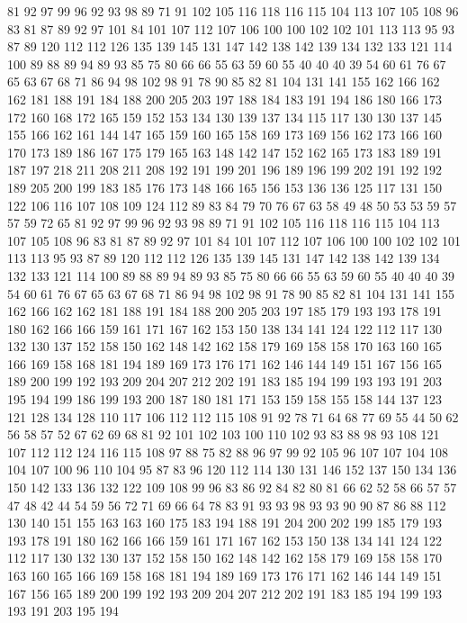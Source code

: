 81 92 97 99 96 92 93 98 89 71 91 102 105 116 118 116 115 104 113 107
105 108 96 83 81 87 89 92 97 101 84 101 107 112 107 106 100 100 102 102
101 113 113 95 93 87 89 120 112 112 126 135 139 145 131 147 142 138 142 139
134 132 133 121 114 100 89 88 89 94 89 93 85 75 80 66 66 55 63 59
60 55 40 40 40 39 54 60 61 76 67 65 63 67 68 71 86 94 98 102
98 91 78 90 85 82 81 104 131 141 155 162 166 162 162 181 188 191 184 188
200 205 203 197 188 184 183 191 194 186 180 166 173 172 160 168 172 165 159 152
153 134 130 139 137 134 115 117 130 130 137 145 155 166 162 161 144 147 165 159
160 165 158 169 173 169 156 162 173 166 160 170 173 189 186 167 175 179 165 163
148 142 147 152 162 165 173 183 189 191 187 197 218 211 208 211 208 192 191 199
201 196 189 196 199 202 191 192 192 189 205 200 199 183 185 176 173 148 166 165
156 153 136 136 125 117 131 150 122 106 116 107 108 109 124 112 89 83 84 79
70 76 67 63 58 49 48 50 53 53 59 57 57 59 72 65 81 92 97 99
96 92 93 98 89 71 91 102 105 116 118 116 115 104 113 107 105 108 96 83
81 87 89 92 97 101 84 101 107 112 107 106 100 100 102 102 101 113 113 95
93 87 89 120 112 112 126 135 139 145 131 147 142 138 142 139 134 132 133 121
114 100 89 88 89 94 89 93 85 75 80 66 66 55 63 59 60 55 40 40
40 39 54 60 61 76 67 65 63 67 68 71 86 94 98 102 98 91 78 90
85 82 81 104 131 141 155 162 166 162 162 181 188 191 184 188 200 205 203 197
185 179 193 193 178 191 180 162 166 166 159 161 171 167 162 153 150 138 134 141
124 122 112 117 130 132 130 137 152 158 150 162 148 142 162 158 179 169 158 158
170 163 160 165 166 169 158 168 181 194 189 169 173 176 171 162 146 144 149 151
167 156 165 189 200 199 192 193 209 204 207 212 202 191 183 185 194 199 193 193
191 203 195 194 199 186 199 193 200 187 180 181 171 153 159 158 155 158 144 137
123 121 128 134 128 110 117 106 112 112 115 108 91 92 78 71 64 68 77 69
55 44 50 62 56 58 57 52 67 62 69 68 81 92 101 102 103 100 110 102
93 83 88 98 93 108 121 107 112 112 124 116 115 108 97 88 75 82 88 96
97 99 92 105 96 107 107 104 108 104 107 100 96 110 104 95 87 83 96 120
112 114 130 131 146 152 137 150 134 136 150 142 133 136 132 122 109 108 99 96
83 86 92 84 82 80 81 66 62 52 58 66 57 57 47 48 42 44 54 59
56 72 71 69 66 64 78 83 91 93 93 98 93 93 90 90 87 86 88 112
130 140 151 155 163 163 160 175 183 194 188 191 204 200 202 199 185 179 193 193
178 191 180 162 166 166 159 161 171 167 162 153 150 138 134 141 124 122 112 117
130 132 130 137 152 158 150 162 148 142 162 158 179 169 158 158 170 163 160 165
166 169 158 168 181 194 189 169 173 176 171 162 146 144 149 151 167 156 165 189
200 199 192 193 209 204 207 212 202 191 183 185 194 199 193 193 191 203 195 194
